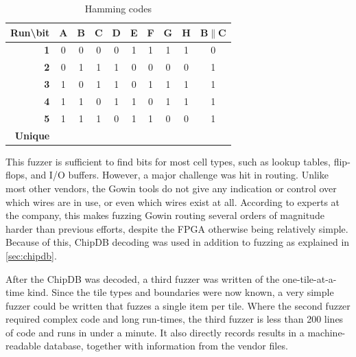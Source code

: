 \documentclass{article}
\newcommand{\cmark}{\ding{51}}%
\begin{document}
\begin{table}[]
\centering
\caption{Hamming codes}
\label{tab:hammingcodes}
\begin{tabular}{r|ccccccccc}
\textbf{Run\textbackslash bit} & \textbf{A} & \textbf{B} & \textbf{C} & \textbf{D} & \textbf{E} & \textbf{F} & \textbf{G} & \textbf{H} & \textbf{B$\parallel$C} \\ \hline
\textbf{1}       & 0          & 0          & 0          & 0          & 1          & 1          & 1          & 1          & 0            \\
\textbf{2}       & 0          & 1          & 1          & 1          & 0          & 0          & 0          & 0          & 1            \\
\textbf{3}       & 1          & 0          & 1          & 1          & 0          & 1          & 1          & 1          & 1            \\
\textbf{4}       & 1          & 1          & 0          & 1          & 1          & 0          & 1          & 1          & 1            \\
\textbf{5}       & 1          & 1          & 1          & 0          & 1          & 1          & 0          & 0          & 1            \\
\textbf{Unique}  &\textbf{\cmark}&\textbf{\cmark}&\textbf{\cmark}&\textbf{\cmark}&\textbf{\cmark}&\textbf{\cmark}&\textbf{\cmark}&\textbf{\cmark}&\textbf{\cmark}             
\end{tabular}
\end{table}

This fuzzer is sufficient to find bits for most cell types, such as lookup tables, flip-flops, and I/O buffers. However, a major challenge was hit in routing. Unlike most other vendors, the Gowin tools do not give any indication or control over which wires are in use, or even which wires exist at all. According to experts at the company, this makes fuzzing Gowin routing several orders of magnitude harder than previous efforts, despite the FPGA otherwise being relatively simple. Because of this, ChipDB decoding was used in addition to fuzzing as explained in \ref{sec:chipdb}.

After the ChipDB was decoded, a third fuzzer was written of the one-tile-at-a-time kind. Since the tile types and boundaries were now known, a very simple fuzzer could be written that fuzzes a single item per tile. Where the second fuzzer required complex code and long run-times, the third fuzzer is less than 200 lines of code and runs in under a minute. It also directly records results in a machine-readable database, together with information from the vendor files.
\end{document}
